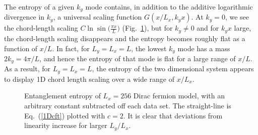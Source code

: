 \documentclass[prl,aps,twocolumn,floatfix,amsmath,amssymb,superscriptaddress,tightenlines]{revtex4}
\begin{document}
The entropy of a given $k_y$ mode contains, in addition to the additive logarithmic divergence in $k_y$, a universal scaling function $G(x/L_x,k_y x)$.  At $k_y=0$, we see the chord-length scaling $C \ln\sin\big( \frac{\pi x}{L} \big)$ (Fig.~\ref{fig:dirac}), but for $k_y \neq 0$ and for $k_y x$ large, the chord-length scaling disappears and the entropy becomes roughly flat as a function of $x/L$.  In fact, for $L_y=L_x=L$, the lowest $k_y$ mode has a mass $2 k_y=4\pi/L$, and hence the entropy of that mode is flat for a large range of $x/L$.  As a result, for $L_y=L_x=L$, the entropy of the two dimensional system appears to display 1D chord length scaling over a wide range of $x/L_x$.

 \begin{figure}
   \begin{center}
   \end{center}
   \caption{Entanglement entropy of $L_x=256$ Dirac fermion model, with an arbitrary constant subtracted off each data set.
    The straight-line is Eq.~(\ref{1Dcft}) plotted with $c=2$.
    It is clear that deviations from linearity increase for larger $L_y/L_x$. 
   }
   \label{fig:dirac}
 \end{figure}
 
\end{document}
